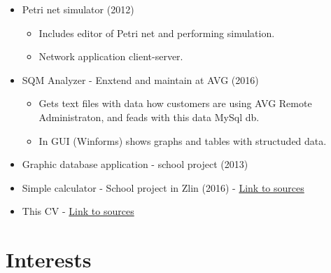 \documentclass[11pt,a4paper,sans]{moderncv}
\newcommand{\Csh}{C{\lserif{\#}}}
\begin{document}
	{
		\begin{itemize}
			\item Petri net simulator (2012)	
			\begin{itemize}
				\item Includes editor of Petri net and performing simulation.
				\item Network application client-server.
			\end{itemize}
		\end{itemize}
	}
	
	\cvitemwithcomment{\Csh{}}{}
	{
		\begin{itemize}
			\item SQM Analyzer - Enxtend and maintain at AVG (2016)
			\begin{itemize}
				\item Gets text files with data how customers are using AVG Remote Administraton, and feads with this data MySql db. 	
				\item In GUI (Winforms) shows graphs and tables with structuded data.
			\end{itemize}
			\item Graphic database application - school project (2013)	
		\end{itemize}
	}
	
	{
		\begin{itemize}
			\item Simple calculator - School project in Zlin (2016) - \href{https://github.com/navrkald/Zlin_wxWidgets_python_simple_calculator}{Link to sources} 
		\end{itemize}
	}
	
	\cvitemwithcomment{\LaTeX}{}
	{
		\begin{itemize}
			\item This CV - \href{https://github.com/navrkald/CV_david_navrkal}{Link to sources} 
		\end{itemize}
	}
	
	\section{Interests}
	
	

	\clearpage
\end{document}
